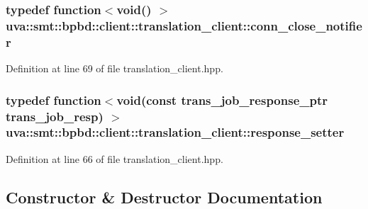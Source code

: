 \subsubsection[{conn\+\_\+close\+\_\+notifier}]{\setlength{\rightskip}{0pt plus 5cm}typedef function$<$void() $>$ {\bf uva\+::smt\+::bpbd\+::client\+::translation\+\_\+client\+::conn\+\_\+close\+\_\+notifier}}\label{classuva_1_1smt_1_1bpbd_1_1client_1_1translation__client_a6bb76738c95be98f5d13370d8e6a1176}


Definition at line 69 of file translation\+\_\+client.\+hpp.

\hypertarget{classuva_1_1smt_1_1bpbd_1_1client_1_1translation__client_aee49acfd2764e30f042c29b1d365f21d}{}
\subsubsection[{response\+\_\+setter}]{\setlength{\rightskip}{0pt plus 5cm}typedef function$<$void(const {\bf trans\+\_\+job\+\_\+response\+\_\+ptr} trans\+\_\+job\+\_\+resp) $>$ {\bf uva\+::smt\+::bpbd\+::client\+::translation\+\_\+client\+::response\+\_\+setter}}\label{classuva_1_1smt_1_1bpbd_1_1client_1_1translation__client_aee49acfd2764e30f042c29b1d365f21d}


Definition at line 66 of file translation\+\_\+client.\+hpp.



\subsection{Constructor \& Destructor Documentation}
\hypertarget{classuva_1_1smt_1_1bpbd_1_1client_1_1translation__client_ae892d7cccc21df88b04e9d26c4f8c23c}{}
